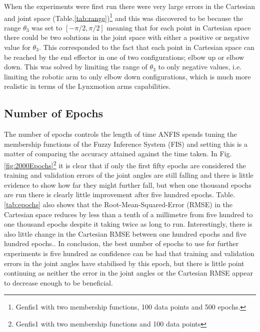 \documentclass[11.5pt, twoside, a4paper]{article}
\begin{document}
When the experiments were first run there were very large errors in the Cartesian and joint space (Table.\ref{tab:range})\footnote{Genfis1 with two membership functions, 100 data points and 500 epochs.} and this was discovered to be because the range $\theta_3$ was set to $\left[-\pi/2,\pi/2\right]$ meaning that for each point in Cartesian space there could be two solutions in the joint space with either a positive or negative value for $\theta_3$. This corresponded to the fact that each point in Cartesian space can be reached by the end effector in one of two configurations; elbow up or elbow down. This was solved by limiting the range of $\theta_3$ to only negative values, i.e. limiting the robotic arm to only elbow down configurations, which is much more realistic in terms of the Lynxmotion arms capabilities.

\begin{table}
\caption{Results from changing range of $\theta_3$. \label{tab:range}}
\end{table}


\subsection{Number of Epochs}
The number of epochs controls the length of time ANFIS spends tuning the membership functions of the Fuzzy Inference System (FIS) and setting this is a matter of comparing the accuracy attained against the time taken. In Fig.\ref{fig:2000Epochs}\footnote{Genfis1 with two membership functions and 100 data points} it is clear that if only the first fifty epochs are considered the training and validation errors of the joint angles are still falling and there is little evidence to show how far they might further fall, but when one thousand epochs are run there is clearly little improvement after five hundred epochs. Table.\ref{tab:epochs} also shows that the Root-Mean-Squared-Error (RMSE) in the Cartesian space reduces by less than a tenth of a millimetre from five hundred to one thousand epochs despite it taking twice as long to run. Interestingly, there is also little change in the Cartesian RMSE between one hundred epochs and five hundred epochs.. In conclusion, the best number of epochs to use for further experiments is five hundred as confidence can be had that training and validation errors in the joint angles have stabilised by this epoch, but there is little point continuing as neither the error in the joint angles or the Cartesian RMSE appear to decrease enough to be beneficial.
\end{document}
